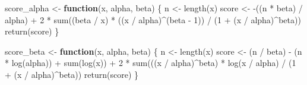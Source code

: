 \documentclass[
]{article}
\newenvironment{Shaded}{\begin{snugshade}}{\end{snugshade}}
\newcommand{\ControlFlowTok}[1]{\textcolor[rgb]{0.13,0.29,0.53}{\textbf{#1}}}
\newcommand{\DecValTok}[1]{\textcolor[rgb]{0.00,0.00,0.81}{#1}}
\newcommand{\FunctionTok}[1]{\textcolor[rgb]{0.00,0.00,0.00}{#1}}
\newcommand{\NormalTok}[1]{#1}
\newcommand{\OtherTok}[1]{\textcolor[rgb]{0.56,0.35,0.01}{#1}}
\newcommand{\SpecialCharTok}[1]{\textcolor[rgb]{0.00,0.00,0.00}{#1}}
\begin{document}
\begin{Shaded}
\begin{Highlighting}[]
\NormalTok{score\_alpha }\OtherTok{\textless{}{-}} \ControlFlowTok{function}\NormalTok{(x, alpha, beta) \{}
\NormalTok{  n }\OtherTok{\textless{}{-}} \FunctionTok{length}\NormalTok{(x)}
\NormalTok{  score }\OtherTok{\textless{}{-}} \SpecialCharTok{{-}}\NormalTok{((n }\SpecialCharTok{*}\NormalTok{ beta) }\SpecialCharTok{/}\NormalTok{ alpha) }\SpecialCharTok{+} \DecValTok{2} \SpecialCharTok{*} \FunctionTok{sum}\NormalTok{((beta }\SpecialCharTok{/}\NormalTok{ x) }\SpecialCharTok{*}\NormalTok{ ((x }\SpecialCharTok{/}\NormalTok{ alpha)}\SpecialCharTok{\^{}}\NormalTok{(beta }\SpecialCharTok{{-}} \DecValTok{1}\NormalTok{)) }\SpecialCharTok{/}\NormalTok{ (}\DecValTok{1} \SpecialCharTok{+}\NormalTok{ (x }\SpecialCharTok{/}\NormalTok{ alpha)}\SpecialCharTok{\^{}}\NormalTok{beta))}
  \FunctionTok{return}\NormalTok{(score)}
\NormalTok{\}}

\NormalTok{score\_beta }\OtherTok{\textless{}{-}} \ControlFlowTok{function}\NormalTok{(x, alpha, beta) \{}
\NormalTok{  n }\OtherTok{\textless{}{-}} \FunctionTok{length}\NormalTok{(x)}
\NormalTok{  score }\OtherTok{\textless{}{-}}\NormalTok{ (n }\SpecialCharTok{/}\NormalTok{ beta) }\SpecialCharTok{{-}}\NormalTok{ (n }\SpecialCharTok{*} \FunctionTok{log}\NormalTok{(alpha)) }\SpecialCharTok{+} \FunctionTok{sum}\NormalTok{(}\FunctionTok{log}\NormalTok{(x)) }\SpecialCharTok{+} \DecValTok{2} \SpecialCharTok{*} \FunctionTok{sum}\NormalTok{(((x }\SpecialCharTok{/}\NormalTok{ alpha)}\SpecialCharTok{\^{}}\NormalTok{beta) }\SpecialCharTok{*} \FunctionTok{log}\NormalTok{(x }\SpecialCharTok{/}\NormalTok{ alpha) }\SpecialCharTok{/}\NormalTok{ (}\DecValTok{1} \SpecialCharTok{+}\NormalTok{ (x }\SpecialCharTok{/}\NormalTok{ alpha)}\SpecialCharTok{\^{}}\NormalTok{beta))}
  \FunctionTok{return}\NormalTok{(score)}
\NormalTok{\}}


\end{Highlighting}
\end{Shaded}
\end{document}
